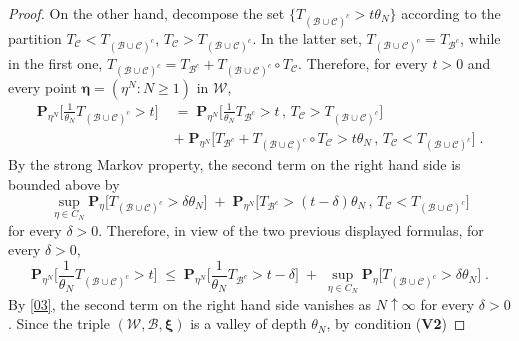 \documentclass[reqno]{amsart}
\begin{document}
\begin{proof}
On the other hand, decompose the set $\{ T_{({{\mathscr B}} \cup {{\mathscr C}})^c} > t
\theta_N\}$ according to the partition $T_{{{\mathscr C}}} < T_{({{\mathscr B}} \cup {{\mathscr C}})^{c}}$, $T_{{{\mathscr C}}} > T_{({{\mathscr B}} \cup {{\mathscr C}})^{c}}$. In the latter
set, $T_{({{\mathscr B}} \cup {{\mathscr C}})^c} = T_{{{\mathscr B}}^c}$, while in the first one,
$T_{({{\mathscr B}} \cup {{\mathscr C}})^c} = T_{{{\mathscr B}}^c} + T_{({{\mathscr B}} \cup {{\mathscr C}})^{c}}
\circ T_{{{\mathscr C}}}$.  Therefore, for every $t>0$ and every point ${{\boldsymbol \eta}} = (\eta^N : N\ge 1)$ in ${{\mathscr W}}$,
\begin{equation*}
\begin{split}
{{\mathbf P}}_{\eta^N} \Big[ \frac 1{\theta_N} T_{({{\mathscr B}} \cup {{\mathscr C}})^c} > t
\Big] \; &=\; {{\mathbf P}}_{\eta^N} \Big[ \frac 1{\theta_N} T_{{{\mathscr B}}^c} > t 
\,,\,  T_{{{\mathscr C}}} > T_{({{\mathscr B}} \cup {{\mathscr C}})^{c}} \Big] \\
& +\; {{\mathbf P}}_{\eta^N} \Big[ 
T_{{{\mathscr B}}^c} + T_{({{\mathscr B}} \cup {{\mathscr C}})^{c}} \circ T_{{{\mathscr C}}}  > t \theta_N
\,,\,  T_{{{\mathscr C}}} < T_{({{\mathscr B}} \cup {{\mathscr C}})^{c}} \Big]\;. 
\end{split}
\end{equation*}
By the strong Markov property, the second term on the right hand side
is bounded above by
\begin{equation*}
\sup_{\eta\in C_N} {{\mathbf P}}_{\eta} \Big[ T_{({{\mathscr B}} \cup {{\mathscr C}})^{c}}  
> \delta \theta_N \Big] \;+\; 
{{\mathbf P}}_{\eta^N} \Big[ T_{{{\mathscr B}}^c}   > (t-\delta) \theta_N
\,,\,  T_{{{\mathscr C}}} < T_{({{\mathscr B}} \cup {{\mathscr C}})^{c}} \Big]  
\end{equation*}
for every $\delta>0$. Therefore, in view of the two previous displayed
formulas, for every $\delta>0$,
\begin{equation*}
{{\mathbf P}}_{\eta^N} \Big[ \frac 1{\theta_N} T_{({{\mathscr B}} \cup {{\mathscr C}})^c} > t
\Big] \; \le\; {{\mathbf P}}_{\eta^N} \Big[ \frac 1{\theta_N} T_{{{\mathscr B}}^c} >
t -\delta \Big]
\; +\; \sup_{\eta\in C_N} {{\mathbf P}}_{\eta} \Big[ T_{({{\mathscr B}} \cup {{\mathscr C}})^{c}}  
> \delta \theta_N \Big]\;.
\end{equation*}
By \eqref{03}, the second term on the right hand side vanishes as
$N\uparrow\infty$ for every $\delta>0$. Since the triple $({{\mathscr W}}, {{\mathscr B}} , {{\boldsymbol \xi}})$ is a valley of depth $\theta_N$, by condition ({\bf V2})

\end{proof}
\end{document}
